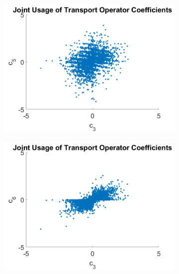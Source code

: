 \documentclass[letterpaper]{article} %
\begin{document}
\begin{figure}[ht]
\centering
\begin{subfigure}[b]{0.45\columnwidth}
\centering
{\includegraphics[width=0.95\columnwidth]{jointCoeff_c3_c5.png}}
\caption{}
\label{subfig:jointCoeff35}
\end{subfigure}
\begin{subfigure}[b]{0.45\columnwidth}
\centering
{\includegraphics[width=0.95\columnwidth]{jointCoeff_c3_c6.png}}
\caption{}
\label{subfig:jointCoeff36}
\end{subfigure}
\begin{subfigure}[b]{0.45\columnwidth}
\centering

\end{subfigure}
\end{figure}
\end{document}

